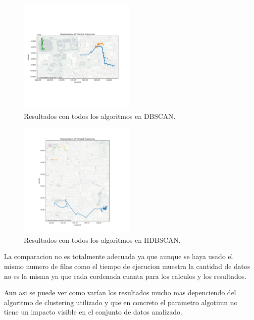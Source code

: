 \FloatBarrier

\begin{figure}[h!]
    \centering
    \includegraphics[width=0.5\textwidth]{img/Geolife/map_dbscan_auto.png}
    \caption{Resultados con todos los algoritmos en DBSCAN.}
    \label{fig:geolife_algorith_dbscan}
\end{figure}

\FloatBarrier

\begin{figure}[h!]
    \centering
    \includegraphics[width=0.5\textwidth]{img/Geolife/map_hdbscan_auto.png}
    \caption{Resultados con todos los algoritmos en HDBSCAN.}
    \label{fig:geolife_algorith_hdbscan}
\end{figure}

\FloatBarrier

La comparacion no es totalmente adecuada ya que aunque se haya usado el mismo numero de filas como el tiempo de ejecucion muestra la cantidad de datos no es la misma ya que cada cordenada cuanta para los calculos y los resultados.

Aun asi se puede ver como varían los resultados mucho mas depenciendo del algoritmo de clustering utilizado y que en concreto el parametro algotimn no tiene un impacto visible en el conjunto de datos analizado.


